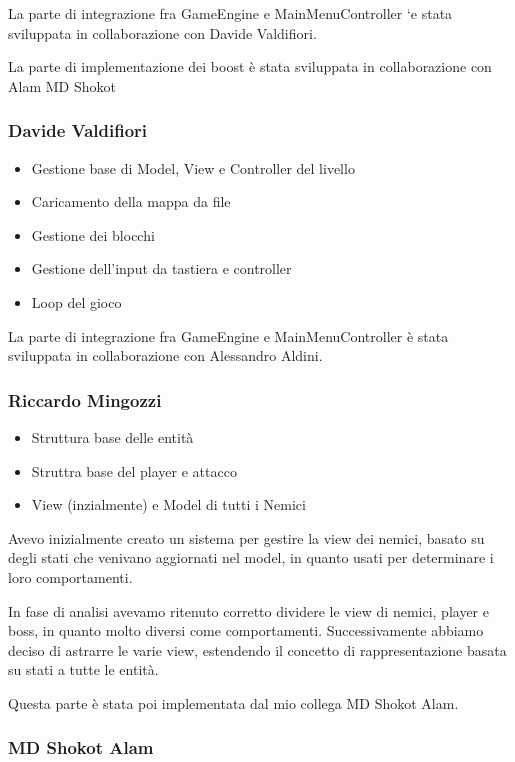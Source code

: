 \documentclass[a4paper,12pt]{report}
\begin{document}
    La parte di integrazione fra GameEngine e MainMenuController `e stata
    sviluppata in collaborazione con Davide Valdifiori.

    La parte di implementazione dei boost è stata sviluppata in collaborazione con Alam MD Shokot
    \subsubsection{Davide Valdifiori}

    \begin{itemize}
        \item Gestione base di Model, View e Controller del livello
        \item Caricamento della mappa da file
        \item Gestione dei blocchi
        \item Gestione dell'input da tastiera e controller
        \item Loop del gioco
    \end{itemize}

    La parte di integrazione fra GameEngine e MainMenuController è stata sviluppata in collaborazione con Alessandro Aldini.

    \subsubsection{Riccardo Mingozzi}

    \begin{itemize}
        \item Struttura base delle entità
        \item Struttra base del player e  attacco
        \item View (inzialmente) e Model di tutti i Nemici
    \end{itemize}

    Avevo inizialmente creato un sistema per gestire la view dei nemici, basato su degli stati che venivano aggiornati nel model, in quanto usati per determinare i loro
    comportamenti.

    In fase di analisi avevamo ritenuto corretto dividere le view di nemici, player e boss, in quanto molto diversi come comportamenti. Successivamente abbiamo deciso di astrarre le varie view, estendendo il concetto di rappresentazione basata su stati a tutte le entità.

    Questa parte è stata poi implementata dal mio collega MD Shokot Alam.

    \subsubsection{MD Shokot Alam}
\end{document}
